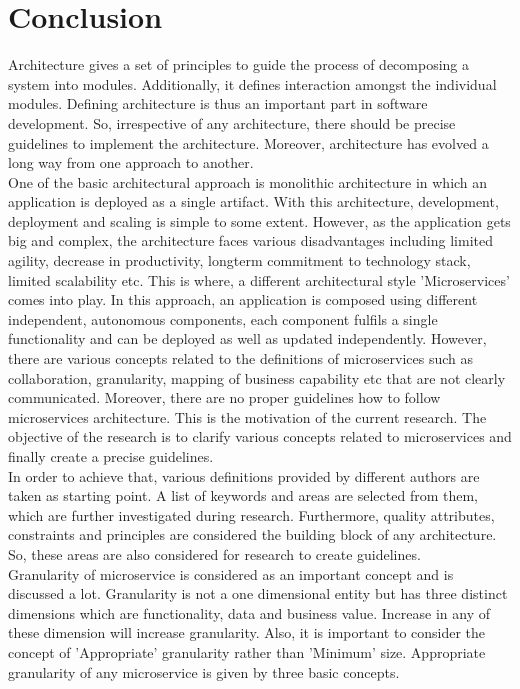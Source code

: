 \chapter{Conclusion}\label{chapter:conclusion}
Architecture gives a set of principles to guide the process of decomposing a system into modules. Additionally, it defines interaction amongst the individual modules. Defining architecture is thus an important part in software development. So, irrespective of any architecture, there should be precise guidelines to implement the architecture. Moreover, architecture has evolved a long way from one approach to another.\\
One of the basic architectural approach is monolithic architecture in which an application is deployed as a single artifact. With this architecture, development, deployment and scaling is simple to some extent. However, as the application gets big and complex, the architecture faces various disadvantages including limited agility, decrease in productivity, longterm commitment to technology stack, limited scalability etc. This is where, a different architectural style 'Microservices' comes into play. In this approach, an application is composed using different independent, autonomous components, each component fulfils a single functionality and can be deployed as well as updated independently. However, there are various concepts related to the definitions of microservices such as collaboration, granularity, mapping of business capability etc that are not clearly communicated. Moreover, there are no proper guidelines how to follow microservices architecture. This is the motivation of the current research. The objective of the research is to clarify various concepts related to microservices and finally create a precise guidelines.\\
In order to achieve that, various definitions provided by different authors are taken as starting point. A list of keywords and areas are selected from them, which are further investigated during research. Furthermore, quality attributes, constraints and principles are considered the building block of any architecture. So, these areas are also considered for research to create guidelines.\\
Granularity of microservice is considered as an important concept and is discussed a lot. Granularity is not a one dimensional entity but has three distinct dimensions which are functionality, data and business value. Increase in any of these dimension will increase granularity. Also, it is important to consider the concept of 'Appropriate' granularity rather than 'Minimum' size. Appropriate granularity of any microservice is given by three basic concepts.
